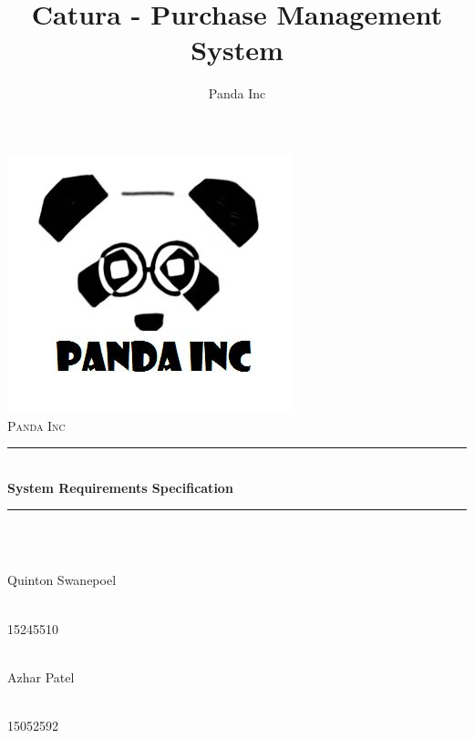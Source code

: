 \documentclass[11pt]{article}
\author{Panda Inc}
\title{Catura - Purchase Management System}
\begin{document}
\begin{titlepage}
	
	\begin{center}
        \includegraphics[width=0.7\linewidth]{PandaInc_logo.jpg}\\[1cm] 
		\textsc{\LARGE Panda Inc}\\[0.3cm]
		\rule{\linewidth}{0.5mm} \\[1cm]
		{ \huge \bfseries  System Requirements Specification}\\[0.5cm]
		\rule{\linewidth}{0.5mm} \\[1cm] 		
  
		
		\begin{minipage}{0.4\textwidth}
			\begin{flushleft} \large
				\emph{} \\
				Quinton {Swanepoel}
			\end{flushleft}
		\end{minipage}
		\begin{minipage}{0.4\textwidth}
			\begin{flushright} \large
				\emph{} \\
				15245510
			\end{flushright}
		\end{minipage}

		\begin{minipage}{0.4\textwidth}
			\begin{flushleft} \large
            	\emph{} \\
				Azhar {Patel}
			\end{flushleft}
		\end{minipage}
		\begin{minipage}{0.4\textwidth}
			\begin{flushright} \large
				\emph{} \\
				15052592
			\end{flushright}
		\end{minipage}
		

\end{center}
\end{titlepage}
\end{document}

